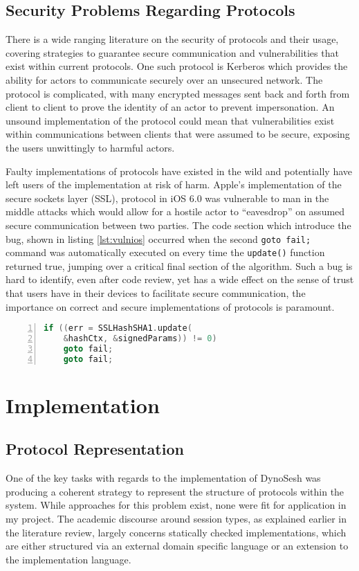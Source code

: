\documentclass{article}
\begin{document}
	\subsection{Security Problems Regarding Protocols}
	There is a wide ranging literature on the security of protocols and their usage, covering strategies to guarantee secure communication and vulnerabilities that exist within current protocols. One such protocol is Kerberos\cite{neuman1994kerberos} which provides the ability for actors to communicate securely over an unsecured network. The protocol is complicated, with many encrypted messages sent back and forth from client to client to prove the identity of an actor to prevent impersonation. An unsound implementation of the protocol could mean that vulnerabilities exist within communications between clients that were assumed to be secure, exposing the users unwittingly to harmful actors.
	
	Faulty implementations of protocols have existed in the wild and potentially have left users of the implementation at risk of harm. Apple's implementation of the secure sockets layer\cite{elgamal1997secure} (SSL), protocol in iOS 6.0 was vulnerable to man in the middle attacks\cite{bland2014finding} which would allow for a hostile actor to ``eavesdrop'' on assumed secure communication between two parties. The code section which introduce the bug, shown in listing \ref{lst:vulnios} occurred when the second \texttt{goto fail;} command was automatically executed on every time the \texttt{update()} function returned true, jumping over a critical final section of the algorithm. Such a bug is hard to identify, even after code review, yet has a wide effect on the sense of trust that users have in their devices to facilitate secure communication, the importance on correct and secure implementations of protocols is paramount.
	\begin{lstlisting}[label={lst:vulnios}, language=c, frame=single, numbers=left, caption=The vulenarble code section in iOS 6.0's SSL implementation\cite{bland2014finding}]
if ((err = SSLHashSHA1.update(
	&hashCtx, &signedParams)) != 0)
	goto fail;
	goto fail;
	\end{lstlisting}
	\section{Implementation}
	\subsection{Protocol Representation}
	One of the key tasks with regards to the implementation of DynoSesh was producing a coherent strategy to represent the structure of protocols within the system. While approaches for this problem exist, none were fit for application in my project. The academic discourse around session types, as explained earlier in the literature review, largely concerns statically checked implementations, which are either structured via an external domain specific language or an extension to the implementation language. 
	
\end{document}

